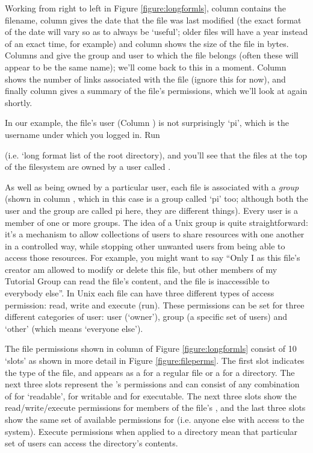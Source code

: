 Working from right to left in Figure \ref{figure:longformls}, column \protect{} contains the filename, column \protect{} gives the date that the file was last modified (the exact format of the date will vary so as to always be `useful'; older files will have a year instead of an exact time, for example) and column \protect{} shows the size of the file in bytes. Columns \protect{} and \protect{} give the group and user to which the file belongs (often these will appear to be the same name); we'll come back to this in a moment. Column \protect{} shows the number of links associated with the file (ignore this for now), and finally column \protect{} gives a summary of the file's permissions, which we'll look at again shortly. 

In our example, the file's user (Column \protect{}) is not surprisingly `pi', which is the username under which you logged in. Run 


(i.e. `long format list of the root directory), and you'll see that the files at the top of the filesystem are owned by a user called . 

As well as being owned by a particular user, each file is associated with a \textit{group} (shown in column \protect{}, which in this case is a group called `pi' too; although both the user and the group are called pi here, they are different things). Every user is a member of one or more groups. The idea of a Unix group is quite straightforward: it's a mechanism to allow collections of users to share resources with one another in a controlled way, while stopping other unwanted users from being able to access those resources. For example, you might want to say ``Only I as this file's creator am allowed to modify or delete this file, but other members of my Tutorial Group can read the file's content, and the file is inaccessible to everybody else''. In Unix each file can have three different types of access permission: read, write and execute (run). These permissions can be set for three different categories of user: user (`owner'), group (a specific set of users) and `other' (which means `everyone else').

The file permissions shown in column \protect{} of Figure \ref{figure:longformls} consist of 10 `slots' as shown in more detail in Figure \ref{figure:fileperms}. The first slot indicates the type of the file, and appears as a \ttout{-} for a regular file or a  for a directory. The next three slots represent the 's  permissions and can consist of any combination of  for `readable',  for writable and  for executable. The next three slots show the read/write/execute permissions for members of the file's , and the last three slots show the same set of available permissions for  (i.e. anyone else with access to the system). Execute permissions when applied to a directory mean that particular set of users can access the directory's contents.


